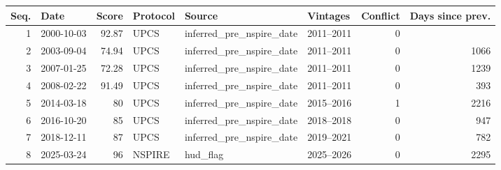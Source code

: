 \begin{tabular}{rlrlllrr}
\toprule
Seq. & Date & Score & Protocol & Source & Vintages & Conflict & Days since prev. \\
\midrule
1 & 2000-10-03 & 92.87 & UPCS & inferred\_pre\_nspire\_date & 2011--2011 & 0 &  \\
2 & 2003-09-04 & 74.94 & UPCS & inferred\_pre\_nspire\_date & 2011--2011 & 0 & 1066 \\
3 & 2007-01-25 & 72.28 & UPCS & inferred\_pre\_nspire\_date & 2011--2011 & 0 & 1239 \\
4 & 2008-02-22 & 91.49 & UPCS & inferred\_pre\_nspire\_date & 2011--2011 & 0 & 393 \\
5 & 2014-03-18 & 80 & UPCS & inferred\_pre\_nspire\_date & 2015--2016 & 1 & 2216 \\
6 & 2016-10-20 & 85 & UPCS & inferred\_pre\_nspire\_date & 2018--2018 & 0 & 947 \\
7 & 2018-12-11 & 87 & UPCS & inferred\_pre\_nspire\_date & 2019--2021 & 0 & 782 \\
8 & 2025-03-24 & 96 & NSPIRE & hud\_flag & 2025--2026 & 0 & 2295 \\
\bottomrule
\end{tabular}
